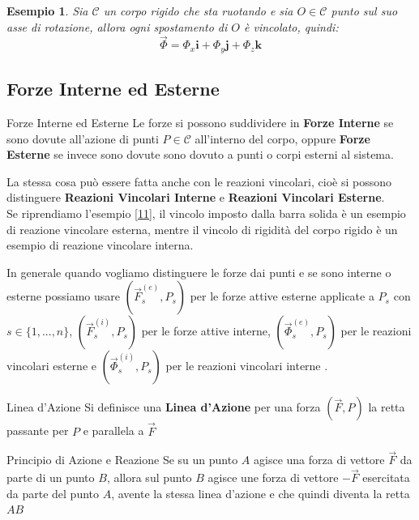 \documentclass[11pt,a4paper,twoside]{article}
\newtheorem{es}{Esempio}
\theoremstyle{definition}
\begin{document}
\begin{es}
	Sia $\mathscr C$ un corpo rigido che sta ruotando e sia $O \in \mathscr C$ punto sul suo asse di rotazione, allora ogni spostamento di $O$ è vincolato, quindi:
	\[ \vec\Phi = \Phi_x \mathbf i + \Phi_y \mathbf j + \Phi_z \mathbf k \]
\end{es}

\subsection{Forze Interne ed Esterne}

\begin{defn}{Forze Interne ed Esterne}{}
	Le forze si possono suddividere in \textbf{Forze Interne} se sono dovute all'azione di punti $P \in \mathscr C$ all'interno del corpo, oppure \textbf{Forze Esterne} se invece sono dovute sono dovuto a punti o corpi esterni al sistema.
\end{defn}

La stessa cosa può essere fatta anche con le reazioni vincolari, cioè si possono distinguere \textbf{Reazioni Vincolari Interne} e \textbf{Reazioni Vincolari Esterne}.\\
Se riprendiamo l'esempio \ref{11}, il vincolo imposto dalla barra solida è un esempio di reazione vincolare esterna, mentre il vincolo di rigidità del corpo rigido è un esempio di reazione vincolare interna.

In generale quando vogliamo distinguere le forze dai punti e se sono interne o esterne possiamo usare $(\vec F_s^{(e)}, P_s)$ per le forze attive esterne applicate a $P_s$ con $s \in \{1,...,n\}$, $(\vec F_s^{(i)}, P_s)$ per le forze attive interne, $(\vec \Phi_s^{(e)}, P_s)$ per le reazioni vincolari esterne e $(\vec \Phi_s^{(i)}, P_s)$ per le reazioni vincolari interne
.
\begin{defn}{Linea d'Azione}{}
	Si definisce una \textbf{Linea d'Azione} per una forza $(\vec F, P)$ la retta passante per $P$ e parallela a $\vec F$
\end{defn}

\begin{center}
\end{center}

\begin{defn}{Principio di Azione e Reazione}{}
	Se su un punto $A$ agisce una forza di vettore $\vec F$ da parte di un punto $B$, allora sul punto $B$ agisce une forza di vettore $-\vec F$ esercitata da parte del punto $A$, avente la stessa linea d'azione e che quindi diventa la retta $AB$
\end{defn}
\end{document}
